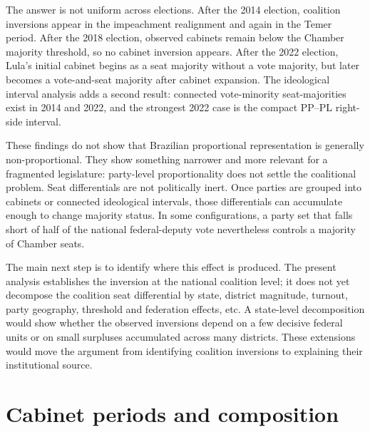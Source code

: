 \documentclass[11pt]{article}
\begin{document}
The answer is not uniform across elections. After the 2014 election, coalition
inversions appear in the impeachment realignment and again in the Temer period.
After the 2018 election, observed cabinets remain below the Chamber majority
threshold, so no cabinet inversion appears. After the 2022 election, Lula's
initial cabinet begins as a seat majority without a vote majority, but later
becomes a vote-and-seat majority after cabinet expansion. The ideological
interval analysis adds a second result: connected vote-minority seat-majorities
exist in 2014 and 2022, and the strongest 2022 case is the compact PP--PL
right-side interval.

These findings do not show that Brazilian proportional representation is
generally non-proportional. They show something narrower and more relevant for a
fragmented legislature: party-level proportionality does not settle the
coalitional problem. Seat differentials are not politically inert. Once parties
are grouped into cabinets or connected ideological intervals, those differentials
can accumulate enough to change majority status. In some configurations, a party
set that falls short of half of the national federal-deputy vote nevertheless
controls a majority of Chamber seats.

The main next step is to identify where this effect is produced. The present
analysis establishes the inversion at the national coalition level; it does not
yet decompose the coalition seat differential by state, district magnitude,
turnout, party geography, threshold and federation effects, etc. A state-level
decomposition would show whether the observed inversions depend on a few
decisive federal units or on small surpluses accumulated across many districts.
These extensions would move the argument from identifying coalition inversions
to explaining their institutional source.


\printbibliography


\appendix


\section{Cabinet periods and composition}
\label{sec:composition}
\end{document}
